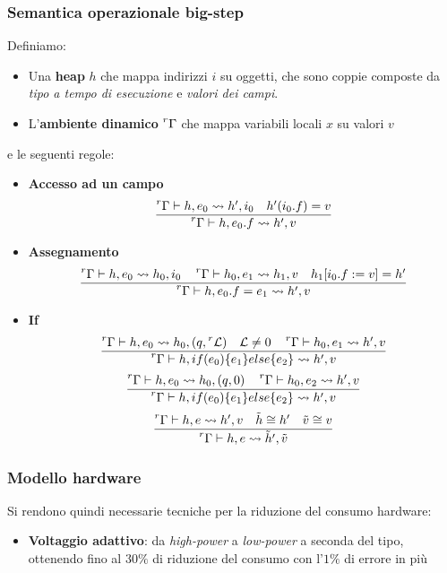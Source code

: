 \subsubsection{Semantica operazionale big-step}
Definiamo:
\begin{itemize}
	\item Una \textbf{heap} $h$ che mappa indirizzi $i$ su oggetti, che sono coppie composte da \textit{tipo a tempo di esecuzione} e \textit{valori dei campi}.
	\item L'\textbf{ambiente dinamico} $\prescript{r}{}{\Gamma}$ che mappa variabili locali $x$ su valori $v$
\end{itemize}
e le seguenti regole:
\begin{itemize}
	\item \textbf{Accesso ad un campo}
	\begin{equation}
		\frac{\prescript{r}{}{\Gamma} \vdash h, e_0 \rightsquigarrow h', i_0 \quad h'(i_0.f)=v}{\prescript{r}{}{\Gamma} \vdash h, e_0.f \rightsquigarrow h', v}
	\end{equation}
	\item \textbf{Assegnamento}
	\begin{equation}
		\frac{\prescript{r}{}{\Gamma} \vdash h, e_0 \rightsquigarrow h_0, i_0 \quad \prescript{r}{}{\Gamma} \vdash h_0, e_1 \rightsquigarrow h_1, v \quad h_1[i_0.f := v] = h'}{\prescript{r}{}{\Gamma} \vdash h, e_0.f  = e_1\rightsquigarrow h', v}
	\end{equation}
	\item \textbf{If}
	\begin{equation}
		\frac{\prescript{r}{}{\Gamma} \vdash h, e_0 \rightsquigarrow h_0, (q, \prescript{r}{}{\mathcal{L}}) \quad \mathcal{L} \neq 0 \quad \prescript{r}{}{\Gamma} \vdash h_0, e_1 \rightsquigarrow h', v}{\prescript{r}{}{\Gamma} \vdash h, if(e_0)\{e_1\}else\{e_2\} \rightsquigarrow h', v}
	\end{equation}
	\begin{equation}
		\frac{\prescript{r}{}{\Gamma} \vdash h, e_0 \rightsquigarrow h_0, (q, 0) \quad \prescript{r}{}{\Gamma} \vdash h_0, e_2 \rightsquigarrow h', v}{\prescript{r}{}{\Gamma} \vdash h, if(e_0)\{e_1\}else\{e_2\} \rightsquigarrow h', v}
	\end{equation} 
	\begin{equation}
		\frac{\prescript{r}{}{\Gamma} \vdash h, e \rightsquigarrow h', v \quad \tilde{h} \cong h' \quad \tilde{v}\cong v}{\prescript{r}{}{\Gamma} \vdash h,e \rightsquigarrow \tilde{h}', \tilde{v}}
	\end{equation}
\end{itemize}

\subsubsection{Modello hardware}
Si rendono quindi necessarie tecniche per la riduzione del consumo hardware:
\begin{itemize}
	\item \textbf{Voltaggio adattivo}: da \textit{high-power} a \textit{low-power} a seconda del tipo, ottenendo fino al $30\%$ di riduzione del consumo con l'$1\%$ di errore in più
\end{itemize}